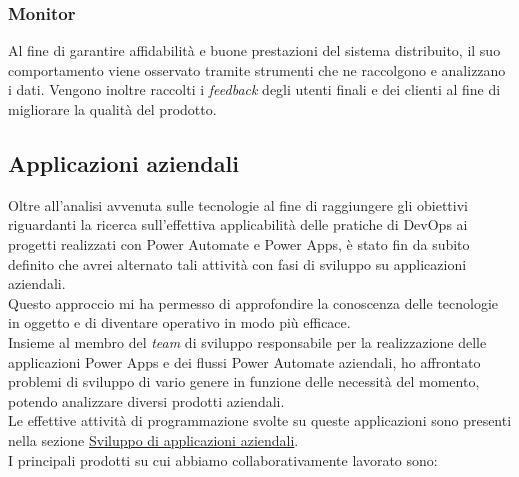 \subsubsection*{Monitor}
Al fine di garantire affidabilità e buone prestazioni del sistema distribuito, il suo comportamento viene osservato tramite strumenti che ne raccolgono e analizzano i dati. 
Vengono inoltre raccolti i \emph{feedback} degli utenti finali e dei clienti al fine di migliorare la qualità del prodotto. 

\subsection{Applicazioni aziendali}
Oltre all'analisi avvenuta sulle tecnologie al fine di raggiungere gli obiettivi riguardanti la ricerca sull'effettiva applicabilità delle pratiche di \gls{DevOps} ai progetti realizzati con Power Automate e Power Apps, è stato fin da subito definito che avrei alternato tali attività con fasi di sviluppo su applicazioni aziendali.\\  
Questo approccio mi ha permesso di approfondire la conoscenza delle tecnologie in oggetto e di diventare operativo in modo più efficace.\\
Insieme al membro del \emph{team} di sviluppo responsabile per la realizzazione delle applicazioni Power Apps e dei flussi Power Automate aziendali, ho affrontato problemi di sviluppo di vario genere in funzione delle necessità del momento, potendo analizzare diversi prodotti aziendali.\\
Le effettive attività di programmazione svolte su queste applicazioni sono presenti nella sezione \hyperref[sviluppoApplicazioni]{Sviluppo di applicazioni aziendali}.\\
I principali prodotti su cui abbiamo collaborativamente lavorato sono:
